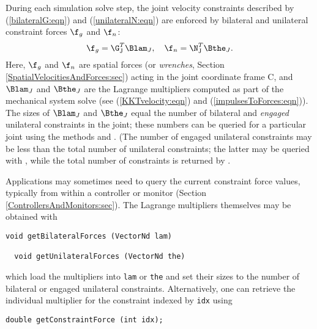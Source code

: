 During each simulation solve step, the joint velocity constraints
described by (\ref{bilateralG:eqn}) and (\ref{unilateralN:eqn}) are
enforced by bilateral and unilateral constraint forces $\f_g$ and
$\f_n$:
%
\begin{equation}
\f_g = \G_\text{J}^T \Blam_J, \quad \f_n = \N_\text{J}^T \Bthe_J.
\end{equation}
%
Here, $\f_g$ and $\f_n$ are spatial forces (or {\it wrenches}, Section
\ref{SpatialVelocitiesAndForces:sec}) acting in the joint coordinate
frame C, and $\Blam_J$ and $\Bthe_J$ are the Lagrange multipliers
computed as part of the mechanical system solve (see
(\ref{KKTvelocity:eqn}) and (\ref{impulsesToForces:eqn})).  The sizes
of $\Blam_J$ and $\Bthe_J$ equal the number of bilateral and {\it
engaged} unilateral constraints in the joint; these numbers can be
queried for a particular joint using the methods
and
.
(The number of engaged unilateral constraints may be less than the
total number of unilateral constraints; the latter may be queried with
,
while the total number of
constraints is returned by
.

Applications may sometimes need to query the current constraint force
values, typically from within a controller
or monitor (Section \ref{ControllersAndMonitors:sec}).
The Lagrange multipliers themselves may be obtained with
\begin{lstlisting}[]
  void getBilateralForces (VectorNd lam)

  void getUnilateralForces (VectorNd the)
\end{lstlisting}
%
which load the multipliers into {\tt lam} or {\tt the} and set their
sizes to the number of bilateral or engaged unilateral
constraints. Alternatively, one can retrieve the individual multiplier
for the constraint indexed by {\tt idx} using
\begin{lstlisting}[]
  double getConstraintForce (int idx);
\end{lstlisting}
%


